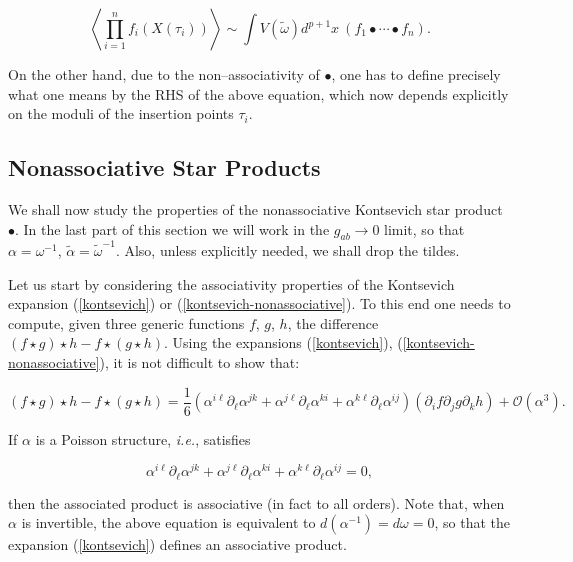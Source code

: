 \documentclass[a4paper,11pt]{article}
\begin{document}
$$
\left\langle \prod_{i=1}^{n}f_{i}\left( X(\tau _{i})\right) \right\rangle
\sim \int V(\widetilde{\omega })d^{p+1}x\ \left( f_{1}\bullet \cdots \bullet
f_{n}\right) .
$$

\noindent 
On the other hand, due to the non--associativity of $\bullet$, one has to
define precisely what one means by the RHS of the above equation, which now
depends explicitly on the moduli of the insertion points $\tau_{i}$.


\subsection{Nonassociative Star Products}


We shall now study the properties of the nonassociative Kontsevich star
product $\bullet$. In the last part of this section we will work in the
$g_{ab} \rightarrow 0$ limit, so that $\alpha = \omega^{-1}$,
$\widetilde{\alpha} = \widetilde{\omega}^{-1}$. Also, unless explicitly
needed, we shall drop the tildes.

Let us start by considering the associativity properties of the Kontsevich
expansion (\ref{kontsevich}) or (\ref{kontsevich-nonassociative}). To this
end one needs to compute, given three generic functions $f$, $g$, $h$, the
difference $(f\star g)\star h-f\star (g\star h)$. Using the expansions
(\ref{kontsevich}), (\ref{kontsevich-nonassociative}), it is not difficult
to show that:

\begin{equation}  \label{associative}
\left( f \star g \right) \star h - f \star \left( g \star h \right) = 
\frac{1}{6} \left( \alpha^{i\ell} \partial_{\ell} \alpha^{jk} + \alpha^{j\ell}
\partial_{\ell} \alpha^{ki} + \alpha^{k\ell} \partial_{\ell} \alpha^{ij}
\right) \left( \partial_{i} f \partial_{j} g \partial_{k} h \right) + 
\mathcal{O}(\alpha^{3}).
\end{equation}

\noindent 
If $\alpha $ is a Poisson structure, \textit{i.e.}, satisfies

$$
\alpha^{i\ell} \partial_{\ell} \alpha^{jk} + \alpha^{j\ell} \partial_{\ell}
\alpha^{ki} + \alpha^{k\ell} \partial_{\ell} \alpha^{ij} = 0,
$$

\noindent 
then the associated product is associative (in fact to all orders). Note
that, when $\alpha$ is invertible, the above equation is equivalent to
$d\left( \alpha^{-1} \right) = d\omega = 0$, so that the expansion
(\ref{kontsevich}) defines an associative product.
\end{document}
